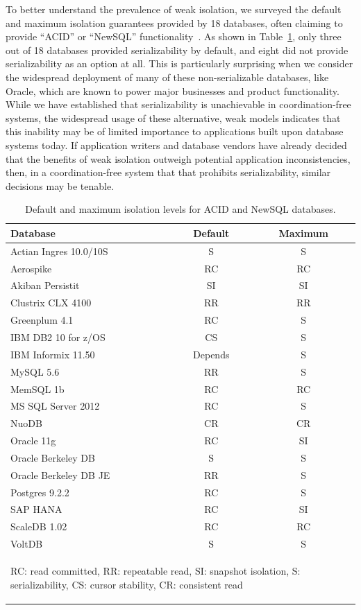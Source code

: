 To better understand the prevalence of weak isolation, we surveyed the
default and maximum isolation guarantees provided by 18 databases,
often claiming to provide ``ACID'' or ``NewSQL''
functionality~\cite{hat-hotos}. As shown in
Table~\ref{table:existing}, only three out of 18 databases provided
serializability by default, and eight did not provide serializability
as an option at all. This is particularly surprising when we consider
the widespread deployment of many of these non-serializable databases,
like Oracle, which are known to power major businesses and product
functionality. While we have established that serializability is
unachievable in coordination-free systems, the widespread usage of these
alternative, weak models indicates that this inability may be of
limited importance to applications built upon database systems
today. If application writers and database vendors have already
decided that the benefits of weak isolation outweigh potential
application inconsistencies, then, in a coordination-free system that
that prohibits serializability, similar decisions may be tenable.

\begin{table}[t!]
\begin{center}
\begin{small}
\begin{tabular}{|l|c|c|}
\hline
Database & Default & Maximum\\\hline
Actian Ingres 10.0/10S & S & S\\
Aerospike & RC & RC\\
Akiban Persistit & SI & SI\\
Clustrix CLX 4100 & RR & RR\\
Greenplum 4.1 & RC & S \\
IBM DB2 10 for z/OS & CS & S\\
IBM Informix 11.50 & Depends & S\\
MySQL 5.6 & RR & S \\
MemSQL 1b & RC & RC\\
MS SQL Server 2012 & RC & S \\
NuoDB & CR & CR\\
Oracle 11g & RC & SI\\
Oracle Berkeley DB & S & S\\
Oracle Berkeley DB JE & RR & S\\
Postgres 9.2.2 & RC & S\\
SAP HANA & RC & SI\\
ScaleDB 1.02 & RC & RC\\
VoltDB & S & S\\
\hline
\multicolumn{3}{|p{7cm}|}{{\begin{small}{RC: read committed, RR: repeatable read, SI: snapshot isolation, S: serializability, CS: cursor stability, CR: consistent read}\end{small}}}\\\hline

\end{tabular}
\caption{Default and maximum isolation levels for ACID and NewSQL
  databases.}
\label{table:existing}
\end{small}
\end{center}
\end{table}

